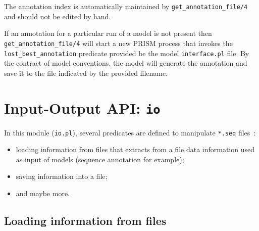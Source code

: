 \documentclass{book}
\begin{document}
The annotation index is automatically maintained by
\texttt{get\_annotation\_file/4} and should not be edited by hand.

If an annotation for a particular run of a model is not present then
\texttt{get\_annotation\_file/4} will start a new PRISM process 
that invokes the \texttt{lost\_best\_annotation} predicate provided
be the model \texttt{interface.pl} file. By the contract of model 
conventions, the model will generate the annotation and save it 
to the file indicated by the provided filename.

\section{Input-Output API: \texttt{io}}
\label{sec:io}

In this module (\texttt{io.pl}), several predicates are defined to
manipulate \texttt{*.seq} files~:
\begin{itemize}
\item loading information from files that extracts from a file data
  information used as input of models (sequence annotation for
  example);
\item saving information into a file;
\item and maybe more. 
\end{itemize}

\subsection{Loading information from files}
\end{document}
